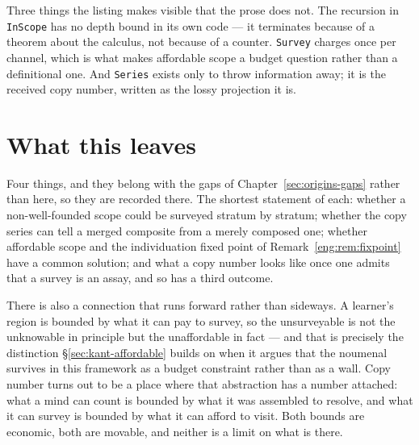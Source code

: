 \noindent
Three things the listing makes visible that the prose does not. The
recursion in \texttt{InScope} has no depth bound in its own code --- it
terminates because of a theorem about the calculus, not because of a
counter. \texttt{Survey} charges once per channel, which is what makes
affordable scope a budget question rather than a definitional one. And
\texttt{Series} exists only to throw information away; it is the received
copy number, written as the lossy projection it is.

\section{What this leaves}

Four things, and they belong with the gaps of
Chapter~\ref{sec:origins-gaps} rather than here, so they are recorded
there. The shortest statement of each: whether a non-well-founded scope
could be surveyed stratum by stratum; whether the copy series can tell a
merged composite from a merely composed one; whether affordable scope and
the individuation fixed point of Remark~\ref{eng:rem:fixpoint} have a
common solution; and what a copy number looks like once one admits that a
survey is an assay, and so has a third outcome.

There is also a connection that runs forward rather than sideways. A
learner's region is bounded by what it can pay to survey, so the
unsurveyable is not the unknowable in principle but the unaffordable in
fact --- and that is precisely the distinction
\S\ref{sec:kant-affordable} builds on when it argues that the noumenal
survives in this framework as a budget constraint rather than as a wall.
Copy number turns out to be a place where that abstraction has a number
attached: what a mind can count is bounded by what it was assembled to
resolve, and what it can survey is bounded by what it can afford to visit.
Both bounds are economic, both are movable, and neither is a limit on what
is there.

